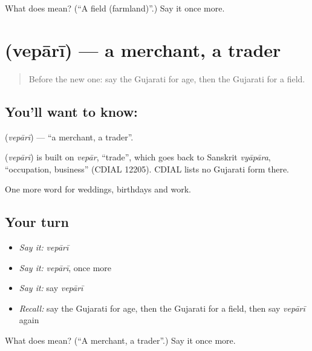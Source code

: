 \begin{tcolorbox}[breakable,colback=teal!4,colframe=teal!35!black,title={Before you move on}]
What does  mean? (\textquotedblleft{}A field (farmland)\textquotedblright{}.) Say it once more.
\end{tcolorbox}
\section[\texorpdfstring{\gu{વેપારી} (vepārī)}{વેપારી (vepārī)}]{ (vepārī) — a merchant, a trader}

\label{lesson:GU-C90-merchant}



\begin{quote}
Before the new one: say the Gujarati for age, then the Gujarati for a field.
\end{quote}

\subsection*{You'll want to know: }
\textbf{} (\emph{vepārī}) — \textquotedblleft{}a merchant, a trader\textquotedblright{}.

\begin{cousinweb}
\textbf{} (\emph{vepārī}) is built on \emph{vepār}, \textquotedblleft{}trade\textquotedblright{}, which goes back to Sanskrit \emph{vyāpāra}, \textquotedblleft{}occupation, business\textquotedblright{} (CDIAL 12205). CDIAL lists no Gujarati form there.
\end{cousinweb}

\begin{grammarlens}[title={What you've built}]
One more word for weddings, birthdays and work.
\end{grammarlens}

\subsection*{Your turn}
\begin{itemize}
\raggedright
  \item \emph{Say it:} \emph{vepārī}
  \item \emph{Say it:} \emph{vepārī}, once more
  \item \emph{Say it:} say \emph{vepārī}
  \item \emph{Recall:} say the Gujarati for age, then the Gujarati for a field, then say \emph{vepārī} again
\end{itemize}

\begin{tcolorbox}[breakable,colback=teal!4,colframe=teal!35!black,title={Before you move on}]
What does  mean? (\textquotedblleft{}A merchant, a trader\textquotedblright{}.) Say it once more.
\end{tcolorbox}
